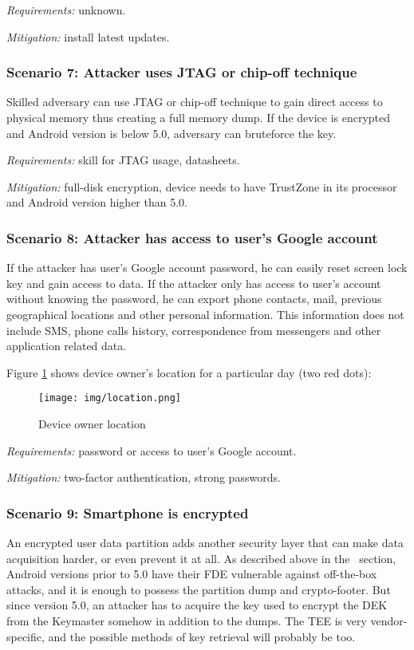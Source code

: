 \textsl{Requirements:} unknown.

\textsl{Mitigation:} install latest updates.

\subsubsection{Scenario 7: Attacker uses JTAG or chip-off technique}

Skilled adversary can use JTAG or chip-off technique to gain direct access to physical memory thus creating a full memory dump. If the device is encrypted and Android version is below 5.0, adversary can bruteforce the key.


\textsl{Requirements:} skill for JTAG usage, datasheets.

\textsl{Mitigation:} full-disk encryption, device needs to have TrustZone in its processor and Android version higher than 5.0.


\subsubsection{Scenario 8: Attacker has access to user’s Google account}

If the attacker has user’s Google account password, he can easily reset screen lock key and gain access to data. If the attacker only has access to user’s account without knowing the password, he can export phone contacts, mail, previous geographical locations and other personal information. This information does not include SMS, phone calls history,  correspondence from messengers and other application related data.

Figure \ref{pic:location} shows device owner’s location for a particular day (two red dots):

\begin{figure}[!ht]
\centering
\texttt{[image: img/location.png]}
\caption{Device owner location}
\label{pic:location}
\end{figure}

\textsl{Requirements:} password or access to user’s Google account.

\textsl{Mitigation:} two-factor authentication, strong passwords.


\subsubsection{Scenario 9: Smartphone is encrypted}

An encrypted user data partition adds another security layer that can make data acquisition harder, or even prevent it at all. As described above in the~\cite{encryption} section, Android versions prior to 5.0 have their FDE vulnerable against off-the-box attacks, and it is enough to possess the partition dump and crypto-footer. But since version 5.0, an attacker has to acquire the key used to encrypt the DEK from the Keymaster somehow in addition to the dumps. The TEE is very vendor-specific, and the possible methods of key retrieval will probably be too. 


